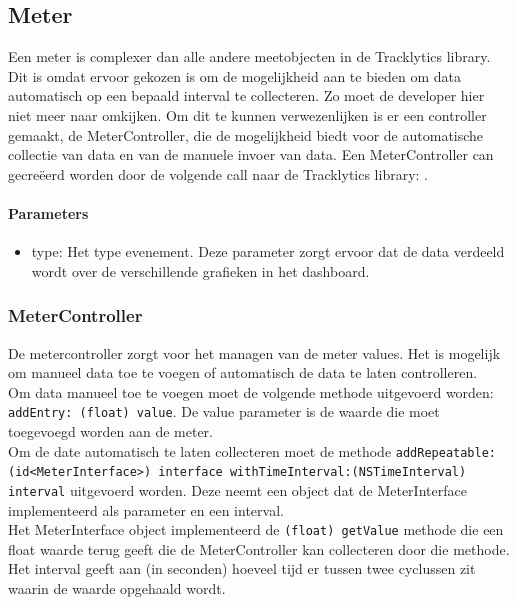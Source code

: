 \subsection{Meter}
Een meter is complexer dan alle andere meetobjecten in de Tracklytics library. Dit is omdat ervoor gekozen is om de mogelijkheid aan te bieden om data automatisch op een bepaald interval te collecteren. Zo moet de developer hier niet meer naar omkijken. Om dit te kunnen verwezenlijken is er een controller gemaakt, de MeterController, die de mogelijkheid biedt voor de automatische collectie van data en van de manuele invoer van data. Een MeterController can gecre\"eerd worden door de volgende call naar de Tracklytics library: \texttt{}. 

\paragraph{Parameters}
\begin{itemize}
\item type: Het type evenement. Deze parameter zorgt ervoor dat de data verdeeld wordt over de verschillende grafieken in het dashboard.
\end{itemize}

\subsubsection{MeterController}
De metercontroller zorgt voor het managen van de meter values. Het is mogelijk om manueel data toe te voegen of automatisch de data te laten controlleren. \\

Om data manueel toe te voegen moet de volgende methode uitgevoerd worden: \texttt{\justify addEntry: (float) value}. De value parameter is de waarde die moet toegevoegd worden aan de meter. \\

Om de date automatisch te laten collecteren moet de methode \texttt{\justify addRepeatable:(id<MeterInterface>) interface withTimeInterval:(NSTimeInterval) interval} uitgevoerd worden. Deze neemt een object dat de MeterInterface implementeerd als parameter en een interval.\\
Het MeterInterface object implementeerd de \texttt{\justify (float) getValue} methode die een float waarde terug geeft die de MeterController kan collecteren door die methode.\\
Het interval geeft aan (in seconden) hoeveel tijd er tussen twee cyclussen zit waarin de waarde opgehaald wordt.




